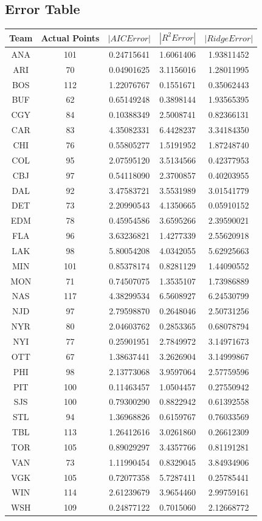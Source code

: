 \subsection*{Error Table}
\begin{longtable}{|c|c|c|c|c|}
	\hline
	Team & Actual Points & $|AIC Error|$ & $|R^2 Error|$ & $|Ridge Error|$ \\
	\hline
	ANA &    101 & 0.24715641 & 1.6061406 & 1.93811452 \\
	ARI &     70 & 0.04901625 & 3.1156016 & 1.28011995 \\
	BOS &    112 & 1.22076767 & 0.1551671 & 0.35062443 \\
	BUF &     62 & 0.65149248 & 0.3898144 & 1.93565395 \\
	CGY &     84 & 0.10388349 & 2.5008741 & 0.82366131 \\
	CAR &     83 & 4.35082331 & 6.4428237 & 3.34184350 \\
	CHI &    76 & 0.55805277 & 1.5191952 & 1.87248740 \\
	\hline
	COL &     95 & 2.07595120 & 3.5134566 & 0.42377953 \\
	CBJ &     97 & 0.54118090 & 2.3700857 & 0.40203955 \\
	DAL &    92  & 3.47583721 & 3.5531989 & 3.01541779 \\
	DET &    73 & 2.20990543 & 4.1350665 & 0.05910152 \\
	EDM &    78 & 0.45954586 & 3.6595266 & 2.39590021 \\
	FLA &    96 & 3.63236821 & 1.4277339 & 2.55620918 \\
	LAK &    98 & 5.80054208 & 4.0342055 & 5.62925663 \\
	MIN &   101 & 0.85378174 & 0.8281129 & 1.44090552 \\
	MON & 71 & 0.74507075 & 1.3535107 & 1.73986889 \\
	NAS &   117 & 4.38299534 & 6.5608927 & 6.24530799 \\
	NJD &    97 & 2.79598870 & 0.2648046 & 2.50731256 \\
	NYR &    80 & 2.04603762 & 0.2853365 & 0.68078794 \\
	NYI &    77 & 0.25901951 & 2.7849972 & 3.14971673 \\
	OTT &    67 & 1.38637441 & 3.2626904 & 3.14999867 \\
	PHI &   98  & 2.13773068 & 3.9597064 & 2.57759596 \\
	PIT &   100 & 0.11463457 & 1.0504457 & 0.27550942 \\
	SJS &   100 & 0.79300290 & 0.8822942 & 0.61392558 \\
	STL &    94 & 1.36968826 & 0.6159767 & 0.76033569 \\
	TBL &   113 & 1.26412616 & 3.0261860 & 0.26612309 \\
	TOR &  105  & 0.89029297 & 3.4357766 & 0.81191281 \\
	VAN &    73 & 1.11990454 & 0.8329045 & 3.84934906 \\
	VGK &   105 & 0.72077358 & 5.7287411 & 0.25785441 \\
	WIN &   114 & 2.61239679 & 3.9654460 & 2.99759161 \\
	\hline
	WSH &   109 & 0.24877122 & 0.7015060 & 2.12668772 \\
	\hline
\end{longtable}
